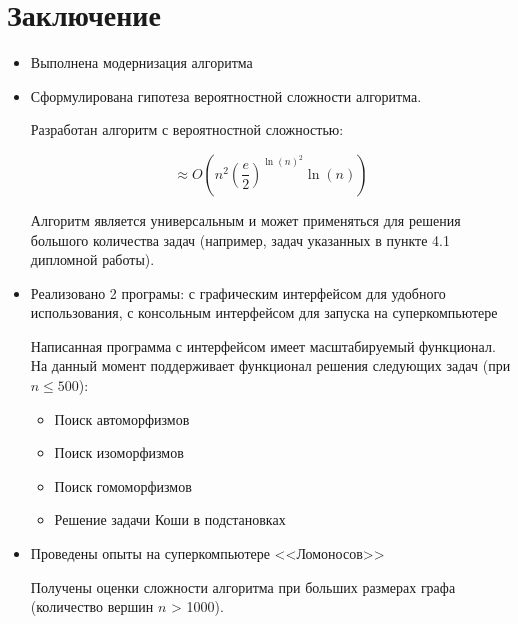 \section*{Заключение}
\label{sec:Conclusion} 
\large

\begin{itemize}
\item Выполнена модернизация алгоритма
\item Сформулирована гипотеза вероятностной сложности алгоритма.

Разработан алгоритм с вероятностной сложностью:

$$\approx O(n^2(\frac{e}{2})^{\ln(n)^2} \ln(n))$$

Алгоритм является универсальным и может применяться для решения большого количества задач (например, задач указанных в пункте 4.1 дипломной работы).

\item Реализовано 2 програмы: с графическим интерфейсом для удобного использования, с консольным интерфейсом для запуска на суперкомпьютере

Написанная программа с интерфейсом имеет масштабируемый функционал. На данный момент поддерживает функционал решения следующих задач (при $n \leq  500$):

\begin{itemize}
\item Поиск автоморфизмов
\item Поиск изоморфизмов
\item Поиск гомоморфизмов
\item Решение задачи Коши в подстановках
\end{itemize}

\item Проведены опыты на суперкомпьютере <<Ломоносов>>

Получены оценки сложности алгоритма при больших размерах графа (количество вершин $n$ > 1000).

\end{itemize}
